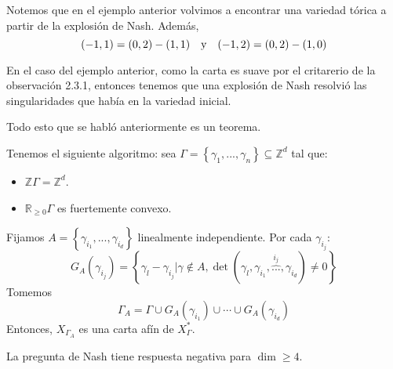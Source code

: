 \documentclass[12pt]{report}
\newcounter{it}
\theoremstyle{largebreak}
\begin{document}
    \begin{obs}
        Notemos que en el ejemplo anterior volvimos a encontrar una variedad tórica a partir de la explosión de Nash. Además,
        \begin{equation*}
            (-1,1)=(0,2)-(1,1)\quad\textup{y}\quad(-1,2)=(0,2)-(1,0)
        \end{equation*}
    \end{obs}

    En el caso del ejemplo anterior, como la carta es suave por el critarerio de la observación 2.3.1, entonces tenemos que una explosión de Nash resolvió las singularidades que había en la variedad inicial.

    Todo esto que se habló anteriormente es un teorema.

    \begin{theor}
        Tenemos el siguiente algoritmo: sea $\Gamma=\left\{\gamma_1,...,\gamma_n \right\}\subseteq\mathbb{Z}^d$ tal que:
        \begin{itemize}
            \item $\mathbb{Z}\Gamma=\mathbb{Z}^d$.
            \item $\mathbb{R}_{\geq0}\Gamma$ es fuertemente convexo.
        \end{itemize}
        Fijamos $A=\left\{\gamma_{ i_1},...,\gamma_{ i_d} \right\}$ linealmente independiente. Por cada $\gamma_{i_j}$:
        \begin{equation*}
            G_A(\gamma_{ i_j})=\left\{\gamma_l-\gamma_{ i_j}\Big|\gamma\notin A,\det(\gamma_l,\gamma_{ i_1},\overset{ i_j}{\hat{...}},\gamma_{i_d})\neq0 \right\}
        \end{equation*}
        Tomemos
        \begin{equation*}
            \Gamma_A=\Gamma\cup G_A(\gamma_{ i_1})\cup\cdots\cup G_A(\gamma_{ i_d})
        \end{equation*}
        Entonces, $X_{\Gamma_A}$ es una carta afín de $X_\Gamma^*$.
    \end{theor}

    \begin{theor}[\textbf{FC, D, ML, Al; 2024}]
        La pregunta de Nash tiene respuesta negativa para $\dim\geq4$.
    \end{theor}
\end{document}
